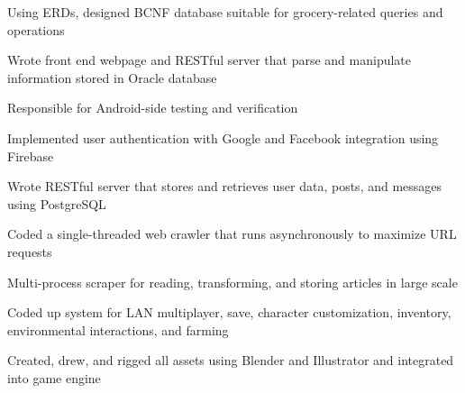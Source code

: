 \documentclass[]{deedy-resume-openfont}
\begin{document}
\begin{tightemize}
\item Using ERDs, designed BCNF database suitable for grocery-related queries and operations
\item Wrote front end webpage and RESTful server that parse and manipulate information stored in Oracle database
\end{tightemize}
\sectionsep

\begin{tightemize}
\item Responsible for Android-side testing and verification
\item Implemented user authentication with Google and Facebook integration using Firebase
\item Wrote RESTful server that stores and retrieves user data, posts, and messages using PostgreSQL
\end{tightemize}
\sectionsep

\begin{tightemize}
\item Coded a single-threaded web crawler that runs asynchronously to maximize URL requests
\item Multi-process scraper for reading, transforming, and storing articles in large scale
\end{tightemize}
\sectionsep

\begin{tightemize}
\item Coded up system for LAN multiplayer, save, character customization, inventory, environmental interactions, and farming
\item Created, drew, and rigged all assets using Blender and Illustrator and integrated into game engine
\end{tightemize}
\sectionsep
\end{document}
